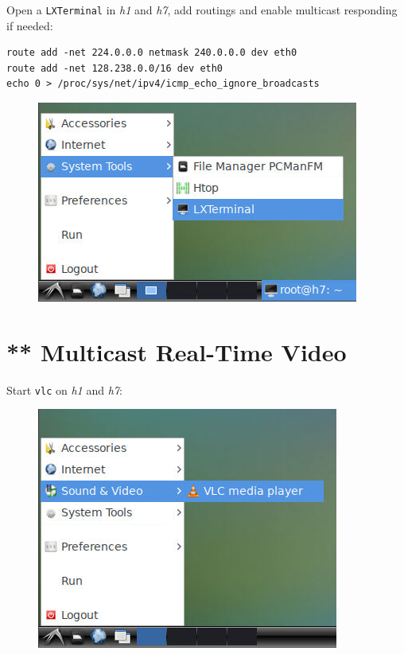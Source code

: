 \documentclass{../UTNetLab}
\begin{document}
    Open a \texttt{LXTerminal} in \textit{h1} and \textit{h7}, add routings and enable multicast responding if needed:
    \begin{lstlisting}[emph={eth0}]
route add -net 224.0.0.0 netmask 240.0.0.0 dev eth0
route add -net 128.238.0.0/16 dev eth0
echo 0 > /proc/sys/net/ipv4/icmp_echo_ignore_broadcasts
    \end{lstlisting}

    \begin{figure}[H]
        \centering
        \includegraphics[scale=1.6]{img/terminal}
    \end{figure}

\section{** Multicast Real-Time Video}
    Start \lstinline{vlc} on \textit{h1} and \textit{h7}:
    \begin{figure}[H]
        \centering
        \includegraphics[scale=1.6]{img/vlc-open}
    \end{figure}
\end{document}
